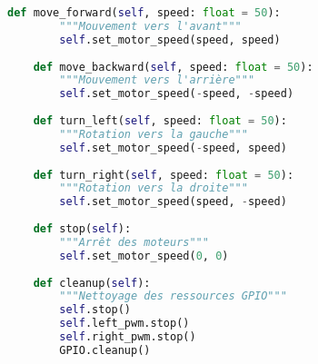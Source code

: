 \begin{lstlisting}[language=Python, caption=Contrôleur des moteurs, label=lst:motor-controller]
    def move_forward(self, speed: float = 50):
        """Mouvement vers l'avant"""
        self.set_motor_speed(speed, speed)
    
    def move_backward(self, speed: float = 50):
        """Mouvement vers l'arrière"""
        self.set_motor_speed(-speed, -speed)
    
    def turn_left(self, speed: float = 50):
        """Rotation vers la gauche"""
        self.set_motor_speed(-speed, speed)
    
    def turn_right(self, speed: float = 50):
        """Rotation vers la droite"""
        self.set_motor_speed(speed, -speed)
    
    def stop(self):
        """Arrêt des moteurs"""
        self.set_motor_speed(0, 0)
    
    def cleanup(self):
        """Nettoyage des ressources GPIO"""
        self.stop()
        self.left_pwm.stop()
        self.right_pwm.stop()
        GPIO.cleanup()
\end{lstlisting}

